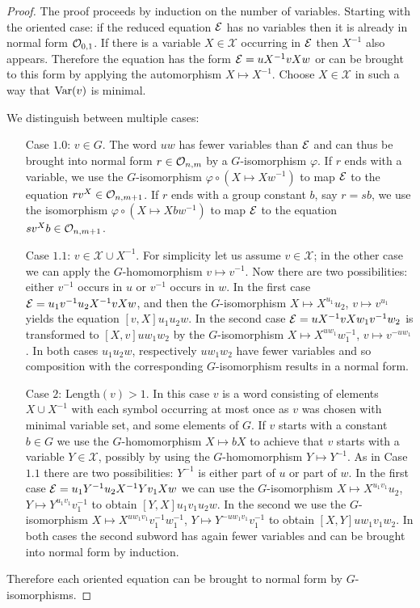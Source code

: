 \documentclass[a4paper,11pt]{amsart}
\begin{document}
\begin{proof}
  The proof proceeds by induction on the number of variables.
  Starting with the oriented case: if the reduced equation $\mathcal{E}$ has no
  variables then it is already in normal form $\mathcal{O}_{0,1}$. If there is a
  variable $X\in\mathcal{X}$ occurring in $\mathcal{E}$ then $X^{-1}$ also appears.
  Therefore the equation has the form
  $\mathcal{E} = uX^{-1}vXw$ or can be brought to this form by applying the
  automorphism $X \mapsto X^{-1}$. Choose $X\in\mathcal{X}$ in such a way that
  $\textup{Var}(v)$ is minimal.
 
  We distinguish between multiple cases:
  \begin{itemize}
  \item[Case $1.0$:] $v\in G$. The word $uw$ has fewer variables than
    $\mathcal{E}$ and can thus be brought into normal form $r\in \mathcal{O}_{n,m}$ by a
    $G$-isomorphism $\varphi$. If $r$ ends with a variable, we use
    the $G$-isomorphism $\varphi \circ (X\mapsto Xw^{-1}) $ to map $\mathcal{E}$
    to the equation $rv^X \in \mathcal{O}_{n,m+1}$.   
    If $r$ ends with a group constant $b$, say $r=sb$, we use the
    isomorphism $\varphi \circ(X \mapsto Xbw^{-1}) $ to map $\mathcal{E}$ to the
    equation $sv^Xb\in \mathcal{O}_{n,m+1}$.

  \item[Case $1.1$:] $v\in\mathcal{X}\cup X^{-1}$. For simplicity let us assume
    $v\in\mathcal{X}$; in the other case we can apply the $G$-homomorphism
    $v \mapsto v^{-1}$.
    Now there are two possibilities: either $v^{-1}$ occurs in $u$ or
    $v^{-1}$ occurs in $w$. In the first case $\mathcal{E}= u_1v^{-1}u_2X^{-1}vXw$, and
    then the $G$-isomorphism $X \mapsto X^{u_1}u_2$, $v \mapsto v^{u_1}$
    yields the equation $[v,X]u_1u_2w$. In the second case
    $\mathcal{E}= uX^{-1}vXw_1v^{-1}w_2$ is transformed to $[X,v]uw_1w_2$ by the
    $G$-isomorphism $X \mapsto X^{uw_1}w_1^{-1}$, $v\mapsto v^{-uw_1}$. In
    both cases $u_1u_2w$, respectively $uw_1w_2$ have fewer variables
    and so composition with the corresponding $G$-isomorphism results in a
    normal form.
  \item[Case $2$:] Length$(v)>1$. In this case $v$ is a word consisting of
    elements $X\cup X^{-1}$ with each symbol occurring at most once as
    $v$ was chosen with minimal variable set, and some elements of
    $G$.  If $v$ starts with a constant $b\in G$ we use the
    $G$-homomorphism $X\mapsto bX$ to achieve that $v$ starts with a
    variable $Y\in\mathcal{X}$, possibly by using the $G$-homomorphism 
    $Y \mapsto Y^{-1}$. As in Case
    $1.1$ there are two possibilities: $Y^{-1}$ is either part of $u$
    or part of $w$. In the first case $\mathcal{E}= u_1 Y^{-1} u_2 X^{-1}Yv_1Xw$
    we can use the $G$-isomorphism $X\mapsto X^{u_1v_1}u_2$,
    $Y\mapsto Y^{u_1v_1}v_1^{-1}$ to obtain $[Y,X]u_1v_1u_2w$. In the
    second we use the $G$-isomorphism
    $X\mapsto X^{uw_1v_1}v_1^{-1}w_1^{-1}$,
    $Y\mapsto Y^{-uw_1v_1}v_1^{-1}$ to obtain $[X,Y]uw_1v_1w_2$. In
    both cases the second subword has again fewer variables and can be
    brought into normal form by induction.
  \end{itemize}
  Therefore each oriented equation can be brought to normal form by 
  $G$-iso\-mor\-phisms.


\end{proof}
\end{document}
